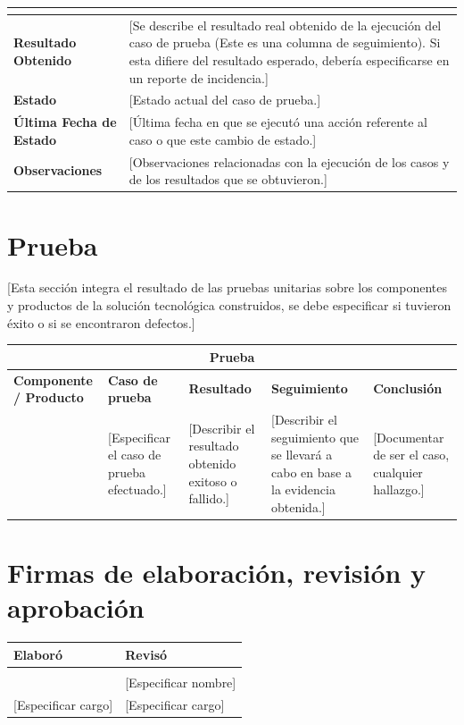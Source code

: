 \documentclass[12pt,letterpaper]{article}
\begin{document}
\begin{center}
\begin{longtable}{|>{\bfseries}p{4.5cm}|p{9.5cm}|}
  \hline
  \multicolumn{2}{|c|}{\textbf{Información para el seguimiento}} \\
  \hline
  Resultado Obtenido &
    [Se describe el resultado real obtenido de la ejecución del caso de prueba (Este es una columna de seguimiento). Si esta difiere del resultado esperado, debería especificarse en un reporte de incidencia.] \\
  \hline
  Estado &
    [Estado actual del caso de prueba.] \\
  \hline
  Última Fecha de Estado &
    [Última fecha en que se ejecutó una acción referente al caso o que este cambio de estado.] \\
  \hline
  Observaciones &
    [Observaciones relacionadas con la ejecución de los casos y de los resultados que se obtuvieron.] \\
  \hline
\end{longtable}
\end{center}

\section{Prueba}

[Esta sección integra el resultado de las pruebas unitarias sobre los componentes y productos de la solución tecnológica construidos, se debe especificar si tuvieron éxito o si se encontraron defectos.]

\begin{center}
\begin{tabularx}{\textwidth}{|X|X|X|X|X|}
  \hline
  \multicolumn{5}{|c|}{\textbf{Prueba}} \\
  \hline
  \textbf{Componente / Producto} &
  \textbf{Caso de prueba} &
  \textbf{Resultado} &
  \textbf{Seguimiento} &
  \textbf{Conclusión} \\
  \hline
  [Especificar: el componente o producto de la solución tecnológica a probar.] &
  [Especificar el caso de prueba efectuado.] &
  [Describir el resultado obtenido exitoso o fallido.] &
  [Describir el seguimiento que se llevará a cabo en base a la evidencia obtenida.] &
  [Documentar de ser el caso, cualquier hallazgo.] \\
  \hline
\end{tabularx}
\end{center}

\section{Firmas de elaboración, revisión y aprobación}

\begin{center}
\begin{tabularx}{\textwidth}{|X|X|}
  \hline
  \textbf{Elaboró} & \textbf{Revisó} \\
  \hline
  & \\[2cm]
  [Especificar nombre] & [Especificar nombre] \\
  {[Especificar cargo]} & {[Especificar cargo]} \\
  \hline
\end{tabularx}
\end{center}
\end{document}
